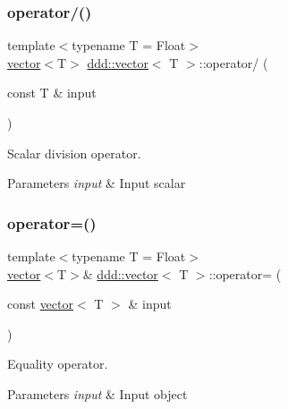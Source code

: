 \subsubsection{\texorpdfstring{operator/()}{operator/()}}
{\footnotesize\ttfamily template$<$typename T = Float$>$ \\
\hyperlink{classddd_1_1vector}{vector}$<$T$>$ \hyperlink{classddd_1_1vector}{ddd\+::vector}$<$ T $>$\+::operator/ (\begin{DoxyParamCaption}\item[{const T \&}]{input }\end{DoxyParamCaption})\hspace{0.3cm}{\ttfamily [inline]}}



Scalar division operator. 


\begin{DoxyParams}{Parameters}
{\em input} & Input scalar \\
\hline
\end{DoxyParams}
\mbox{\label{classddd_1_1vector_a0aa127ccd971b78897b99b76f779f87c}} 
\subsubsection{\texorpdfstring{operator=()}{operator=()}}
{\footnotesize\ttfamily template$<$typename T = Float$>$ \\
\hyperlink{classddd_1_1vector}{vector}$<$T$>$\& \hyperlink{classddd_1_1vector}{ddd\+::vector}$<$ T $>$\+::operator= (\begin{DoxyParamCaption}\item[{const \hyperlink{classddd_1_1vector}{vector}$<$ T $>$ \&}]{input }\end{DoxyParamCaption})\hspace{0.3cm}{\ttfamily [inline]}}



Equality operator. 


\begin{DoxyParams}{Parameters}
{\em input} & Input object \\
\hline
\end{DoxyParams}
\mbox{\label{classddd_1_1vector_a7595b24534ba95d03d9ace253a7c355f}} 
